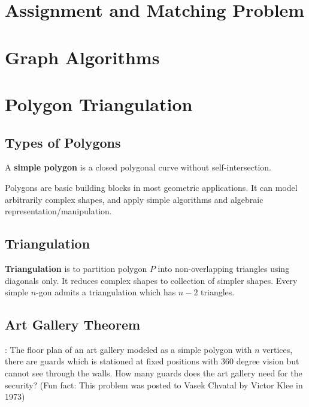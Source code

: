 \documentclass[10pt]{book}
\begin{document}
		\chapter{Assignment and Matching Problem}

		\chapter{Graph Algorithms}
		
		\chapter{Polygon Triangulation}
			\section{Types of Polygons}
				 A \textbf{simple polygon} is a closed polygonal curve without self-intersection.
				\begin{figure}[h!]
					\centering
				\end{figure}
				Polygons are basic building blocks in most geometric applications. It can model arbitrarily complex shapes, and apply simple algorithms and algebraic representation/manipulation.
			\section{Triangulation}
				 \textbf{Triangulation} is to partition polygon $P$ into non-overlapping triangles using diagonals only. It reduces complex shapes to collection of simpler shapes. Every simple $n$-gon admits a triangulation which has $n-2$ triangles.
				
			\section{Art Gallery Theorem}
				: The floor plan of an art gallery modeled as a simple polygon with $n$ vertices, there are guards which is stationed at fixed positions with 360 degree vision but cannot see through the walls. How many guards does the art gallery need for the security? (Fun fact: This problem was posted to Vasek Chvatal by Victor Klee in 1973)				
\end{document}
